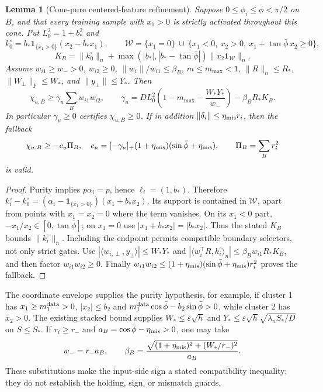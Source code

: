 \documentclass{article} %
\theoremstyle{plain}
\newtheorem{lemma}[theorem]{Lemma}
\theoremstyle{definition}
\theoremstyle{remark}
\begin{document}
\begin{lemma}[Cone-pure centered-feature refinement]\label{sbgap:u-side}
Suppose $0\le\phi_i\le\bar\phi<\pi/2$ on $B$, and that every training
sample with $x_1>0$ is strictly activated throughout this cone.
Put $L_0^2=1+b_*^2$ and
\[
 k_0^\circ=b_*\mathbf1_{\{x_1>0\}}(x_2-b_*x_1),\qquad
 \mathcal W=\{x_1=0\}\ \cup\
 \{x_1<0,\ x_2>0,\ x_1+\tan\bar\phi\,x_2\ge0\},
\]
\[
 K_B=\|k_0^\circ\|_n+
       \max(|b_*|,|b_*-\tan\bar\phi|)
                        \|x_2\mathbf1_{\mathcal W}\|_n.
\]
Assume $w_{i1}\ge w_->0$, $w_{i2}\ge0$,
$\|w_i\|/w_{i1}\le\beta_B$, $m\le m_{\max}<1$,
$\|R\|_n\le R_*$, $\|W_\perp\|_F\le W_*$, and $\|y_\perp\|\le Y_*$.
Then
\[
 \chi_{u,B}\ge\gamma_u\sum_Bw_{i1}w_{i2},\qquad
 \gamma_u=D L_0^2\left(1-m_{\max}-\frac{W_*Y_*}{w_-}\right)
                                      -\beta_BR_*K_B.
\]
In particular $\gamma_u\ge0$ certifies $\chi_{u,B}\ge0$.
If in addition $\|\delta_i\|\le\eta_{\rm mis}r_i$, then the fallback
\[
 \chi_{u,B}\ge-c_u\Pi_B,\quad
 c_u=[-\gamma_u]_+(1+\eta_{\rm mis})
                       (\sin\bar\phi+\eta_{\rm mis}),\qquad
 \Pi_B=\sum_Br_i^2
\]
is valid.
\end{lemma}
\begin{proof}
Purity implies $p\alpha_i=p$, hence $\ell_i=(1,b_*)$.
Therefore $k_i^\circ-k_0^\circ=(\alpha_i-\mathbf1_{\{x_1>0\}})
(x_1+b_*x_2)$. Its support is contained in $\mathcal W$, apart from
points with $x_1=x_2=0$ where the term vanishes. On its $x_1<0$ part,
$-x_1/x_2\in[0,\tan\bar\phi]$; on $x_1=0$ use
$|x_1+b_*x_2|=|b_*x_2|$. Thus the stated $K_B$ bounds
$\|k_i^\circ\|_n$. Including the endpoint permits compatible boundary
selectors, not only strict gates.
Use
$|\langle w_{i,\perp},y_\perp\rangle|\le W_*Y_*$
and
$|\langle w_i^\top R,k_i^\circ\rangle_n|
\le\beta_Bw_{i1}R_*K_B$, and then factor $w_{i1}w_{i2}\ge0$.
Finally
$w_{i1}w_{i2}\le(1+\eta_{\rm mis})
(\sin\bar\phi+\eta_{\rm mis})r_i^2$ proves the fallback.
\end{proof}

The coordinate envelope supplies the purity hypothesis, for example, if
cluster 1 has $x_1\ge m_1^{\rm data}>0$, $|x_2|\le b_2$ and
$m_1^{\rm data}\cos\bar\phi-b_2\sin\bar\phi>0$, while cluster 2 has
$x_2>0$. The existing stacked bound supplies
$W_*\le\varepsilon\sqrt h$ and
$Y_*\le\varepsilon\sqrt h\sqrt{\lambda_nS_*/D}$ on $S\le S_*$.
If $r_i\ge r_-$ and
$a_B=\cos\bar\phi-\eta_{\rm mis}>0$, one may take
\[
 w_-=r_-a_B,\qquad
 \beta_B=\frac{\sqrt{(1+\eta_{\rm mis})^2+(W_*/r_-)^2}}{a_B}.
\]
These substitutions make the input-side sign a stated compatibility
inequality; they do not establish the holding, sign, or mismatch guards.
\end{document}
